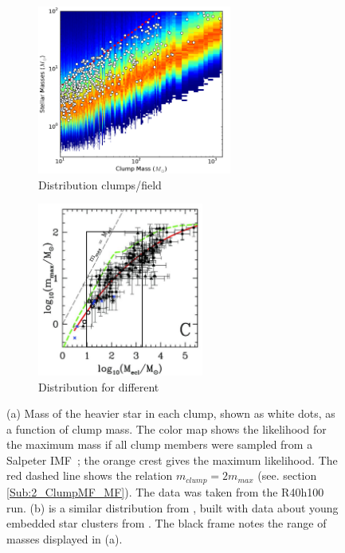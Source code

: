  \begin{figure}
\center
    \centering
    \begin{subfigure}[b]{\textwidth}
    	\centering
    	\includegraphics[width=0.7\textwidth]{Figures/2_MaxMass}
        \caption{Distribution clumps/field}
        \label{Fig:2_MaxMass}
    \end{subfigure}
    \begin{subfigure}[b]{\textwidth}
    	\centering
    	\includegraphics[width=0.6\textwidth]{Figures/2_weidner}
        \caption{Distribution for different \tHub}
        \label{Fig:2_weidner}
    \end{subfigure}
\caption[$M_{clump} - m_{max}$ relation for HL clumps and observed embedded clusters]{(a) Mass of the heavier star in each clump, shown as white dots, as a function of clump mass. The color map shows the likelihood for the maximum mass if all clump members were  sampled from a Salpeter IMF~; the orange crest gives the maximum likelihood. The red dashed line shows the  relation $m_{clump} = 2 m_{max}$ (see. section \ref{Sub:2_ClumpMF_MF}). The data was taken from the R40h100 run. (b) is a similar distribution from \protect\cite{Weidner2013}, built with data about young embedded star clusters from \cite{Weidner2010}. The black frame notes the range of masses displayed in (a). } 
\label{Fig:2_McMmax}
\end{figure}


